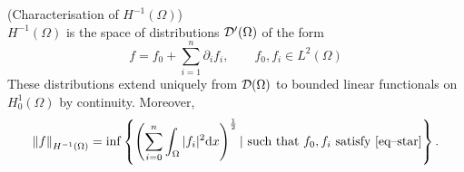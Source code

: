 \documentclass[11pt]{article}
\begin{document}
			\begin{thm}
				(Characterisation of $H^{-1}(\Omega)$)\\
				$H^{-1}(\Omega)$ is the space of distributions $\mathcal{D}^\prime(\Omega)$ of the form
				\begin{equation}\label{eq--star}
					f=f_0+\sum_{i=1}^n\partial_i f_i,\qquad f_0,f_i\in L^2(\Omega)
				\end{equation}
				These distributions extend uniquely from $\mathcal{D}(\Omega)$ to bounded linear functionals on $H^1_0(\Omega)$ by continuity. Moreover, 
				\begin{equation}
				\label{Hminusone}	\norm{f}_{H^{-1}(\Omega)}=\inf\left\{\left(\sum_{i=0}^n\int_{\Omega}|f_i|^2\mathrm{d}x\right)^{\frac{1}{2}}|\text{ such that $f_0,f_i$ satisfy \eqref{eq--star}}\right\}.
				\end{equation}
			\end{thm}
\end{document}

